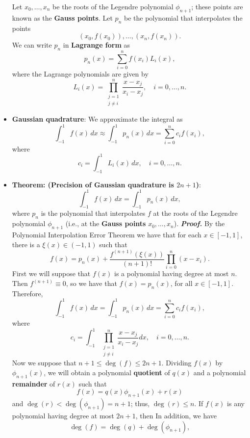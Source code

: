 \documentclass{report}
\begin{document}
\begin{itemize}
            Let $x_0, \ldots, x_n$ be the roots of the Legendre polynomial $\phi_{n+1}$; these points are known as the \textbf{Gauss points}.
            \bigbreak \noindent 
            Let $p_n$ be the polynomial that interpolates the points
            $$(x_0, f(x_0)), \ldots, (x_n, f(x_n)).$$
            We can write $p_n$ in \textbf{Lagrange form} as
            $$p_n(x) = \sum_{i=0}^n f(x_i) L_i(x),$$
            where the Lagrange polynomials are given by
            $$L_i(x) = \prod_{\substack{j = 1 \\ j \neq i}}^n \frac{x - x_j}{x_i - x_j}, \quad i = 0,\ldots,n.$$
        \item \textbf{Gaussian quadrature}:
            We approximate the integral as
            $$\int_{-1}^1 f(x)\,dx \approx \int_{-1}^1 p_n(x)\,dx = \sum_{i=0}^n c_i f(x_i),$$
            where
            $$c_i = \int_{-1}^1 L_i(x)\, dx, \quad i = 0,\ldots,n.$$
        \item \textbf{Theorem: (Precision of Gaussian quadrature is $2n+1$)}:
            $$\int_{-1}^1 f(x)\, dx = \int_{-1}^1 p_n(x)\,dx,$$
            where $p_n$ is the polynomial that interpolates $f$ at the roots of the Legendre polynomial $\phi_{n+1}$ (i.e., at the \textbf{Gauss points} $x_0,\ldots,x_n$).
            \bigbreak \noindent 
            \textbf{\textit{Proof.}} 
            By the Polynomial Interpolation Error Theorem we have that for each $x \in [-1,1]$, there is a $\xi(x) \in (-1,1)$ such that
            $$f(x) = p_n(x) + \frac{f^{(n+1)}(\xi(x))}{(n+1)!} \prod_{i=0}^n (x - x_i).$$
            \bigbreak \noindent 
            First we will suppose that $f(x)$ is a polynomial having degree at most $n$. Then $f^{(n+1)} \equiv 0$, so we have that $f(x) = p_n(x)$, for all $x \in [-1,1]$. Therefore,
            $$\int_{-1}^1 f(x)\,dx = \int_{-1}^1 p_n(x)\,dx = \sum_{i=0}^n c_i f(x_i),$$
            where
            $$c_i = \int_{-1}^1 \prod_{\substack{j = 1 \\ j \neq i}}^n \frac{x - x_j}{x_i - x_j} dx, \quad i = 0,\ldots,n.$$
            Now we suppose that $n+1 \leq \deg(f) \leq 2n + 1$. Dividing $f(x)$ by $\phi_{n+1}(x)$, we will obtain a polynomial \textbf{quotient} of $q(x)$ and a polynomial \textbf{remainder} of $r(x)$ such that
            $$f(x) = q(x) \phi_{n+1}(x) + r(x)$$
            and $\deg(r) < \deg(\phi_{n+1}) = n+1$; thus, $\deg(r) \leq n$.
            \bigbreak \noindent 
            If $f(x)$ is any polynomial having degree at most $2n + 1$, then
            \bigbreak \noindent 
            In addition, we have
            $$\deg(f) = \deg(q) + \deg(\phi_{n+1}),$$

\end{itemize}
\end{document}
